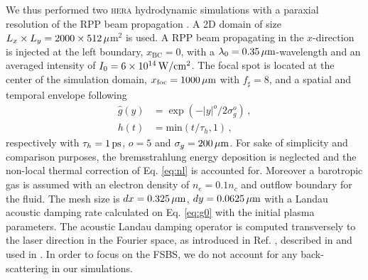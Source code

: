 \documentclass[
 reprint,
 superscriptaddress,
 amsmath,amssymb,
 aps,
]{revtex4-1}
\begin{document}
We thus performed two \textsc{hera} hydrodynamic simulations with a paraxial resolution of the RPP beam propagation \cite[]{Loiseau_2006}. 
A 2D domain of size $L_x \times L_y = 2000 \times 512\, \rm \mu$m$^2$ is used. 
A RPP beam  propagating in the $x$-direction is injected at the left boundary, $x_\mathrm{BC}=0$, with a  $\lambda_0=0.35\, \rm\mu m$-wavelength and an averaged intensity of $I_0=6\times 10^{14}\, \rm W/cm^2$.
The focal spot is located at the center of the simulation domain, $x_\mathrm{foc}=1000\, \rm \mu m$ with  $f_\sharp = 8$, and
a spatial and temporal envelope following
\begin{align}
    \hat{g}(y) &= \exp(-\vert y\vert ^o/2\sigma_g^o)  \, ,  \label{eq:g}\\
    h(t) &= \mathrm{min}(t/\tau_h,1) \, ,\label{eq:h}
\end{align}
respectively with $\tau_h=1\, \rm ps$,  $o=5$ and $\sigma_g = 200\,\rm \mu m$. 
For sake of simplicity and comparison purposes, the bremsstrahlung energy deposition is neglected and the non-local thermal correction of Eq. \eqref{eq:nl} is accounted for.  
Moreover a barotropic gas is assumed  with an electron density of $n_e =0.1n_c $ and outflow boundary for the fluid.
The mesh size is $dx =0.325\,\rm \mu m$, $dy = 0.0625\, \rm \mu m$
with a Landau acoustic damping rate calculated on  Eq. \eqref{eq:g0} with the initial plasma parameters. 
The acoustic Landau damping operator is computed transversely to the laser direction in the Fourier space, as introduced in Ref. \cite[]{POP_Rose_96}, described in \cite[]{Berger_98} and used in   \cite{phd-PEML,Masson_2006,Huller_2008}.
In order to focus on the FSBS, we do not account for any back-scattering in our simulations. 
\end{document}
